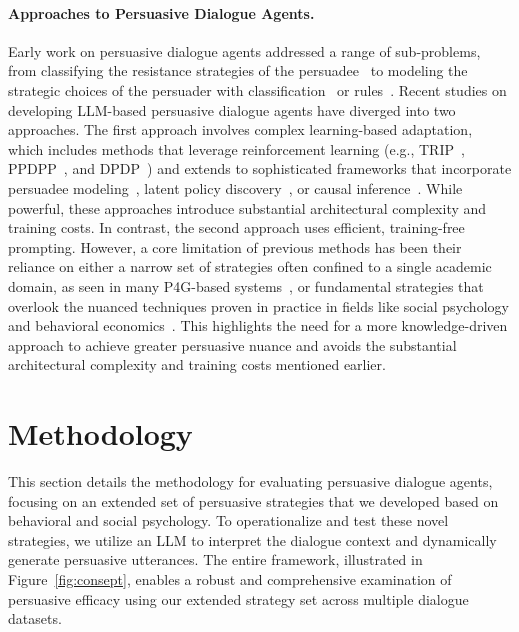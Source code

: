 \documentclass[11pt]{article}
\begin{document}
\paragraph{Approaches to Persuasive Dialogue Agents.}
Early work on persuasive dialogue agents addressed a range of sub-problems, from classifying the resistance strategies of the persuadee~\citep{tian-etal-2020-understanding} to modeling the strategic choices of the persuader with classification~\citep[e.g.,][]{saha-etal-2021-performance, mishra-etal-2022-pepds} or rules~\citep[e.g.,][]{chaves2021effects}. 
Recent studies on developing LLM-based persuasive dialogue agents have diverged into two approaches.  
The first approach involves complex learning-based adaptation, which includes methods that leverage reinforcement learning (e.g., TRIP~\citep{zhang-etal-2024-strength}, PPDPP~\citep{deng2024plug}, and DPDP~\citep{he-etal-2024-planning}) and extends to sophisticated frameworks that incorporate persuadee modeling~\citep{he2025simulating}, latent policy discovery~\citep{he2025simulationfree}, or causal inference~\citep{zeng2025causal}. 
While powerful, these approaches introduce substantial architectural complexity and training costs.
In contrast, the second approach uses efficient, training-free prompting. 
However, a core limitation of previous methods has been their reliance on either a narrow set of strategies often confined to a single academic domain, as seen in many P4G-based systems~\citep{cheng2024cooper, song-wang-2024-like}, or fundamental strategies that overlook the nuanced techniques proven in practice in fields like social psychology and behavioral economics~\citep{jin-etal-2024-persuading}. This highlights the need for a more knowledge-driven approach to achieve greater persuasive nuance and avoids the substantial architectural complexity and training costs mentioned earlier.


\section{Methodology}
\label{sec:procot-rich}
This section details the methodology for evaluating persuasive dialogue agents, focusing on
an extended set of persuasive strategies that we developed based on behavioral and social psychology. 
To operationalize and test these novel strategies, we utilize an LLM to interpret the dialogue context and dynamically generate persuasive utterances.
The entire framework, illustrated in Figure~\ref{fig:consept}, enables a robust and comprehensive examination of persuasive efficacy using our extended strategy set across multiple dialogue datasets.
\end{document}
